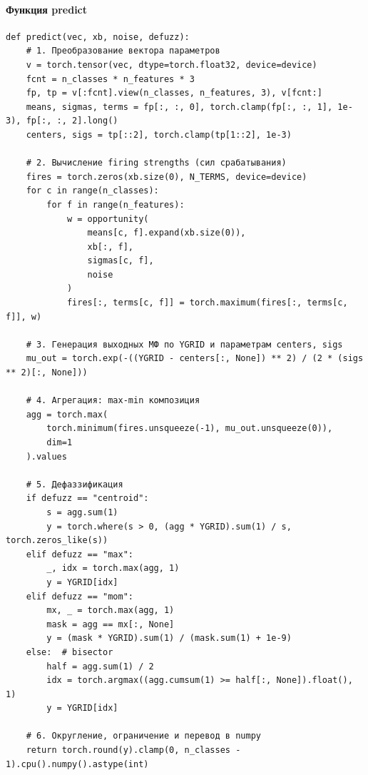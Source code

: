 \paragraph{Функция predict}
\begin{center}
\begin{verbatim}
def predict(vec, xb, noise, defuzz):
    # 1. Преобразование вектора параметров
    v = torch.tensor(vec, dtype=torch.float32, device=device)
    fcnt = n_classes * n_features * 3
    fp, tp = v[:fcnt].view(n_classes, n_features, 3), v[fcnt:]
    means, sigmas, terms = fp[:, :, 0], torch.clamp(fp[:, :, 1], 1e-3), fp[:, :, 2].long()
    centers, sigs = tp[::2], torch.clamp(tp[1::2], 1e-3)

    # 2. Вычисление firing strengths (сил срабатывания)
    fires = torch.zeros(xb.size(0), N_TERMS, device=device)
    for c in range(n_classes):
        for f in range(n_features):
            w = opportunity(
                means[c, f].expand(xb.size(0)),
                xb[:, f],
                sigmas[c, f],
                noise
            )
            fires[:, terms[c, f]] = torch.maximum(fires[:, terms[c, f]], w)

    # 3. Генерация выходных МФ по YGRID и параметрам centers, sigs
    mu_out = torch.exp(-((YGRID - centers[:, None]) ** 2) / (2 * (sigs ** 2)[:, None]))

    # 4. Агрегация: max-min композиция
    agg = torch.max(
        torch.minimum(fires.unsqueeze(-1), mu_out.unsqueeze(0)),
        dim=1
    ).values

    # 5. Дефаззификация
    if defuzz == "centroid":
        s = agg.sum(1)
        y = torch.where(s > 0, (agg * YGRID).sum(1) / s, torch.zeros_like(s))
    elif defuzz == "max":
        _, idx = torch.max(agg, 1)
        y = YGRID[idx]
    elif defuzz == "mom":
        mx, _ = torch.max(agg, 1)
        mask = agg == mx[:, None]
        y = (mask * YGRID).sum(1) / (mask.sum(1) + 1e-9)
    else:  # bisector
        half = agg.sum(1) / 2
        idx = torch.argmax((agg.cumsum(1) >= half[:, None]).float(), 1)
        y = YGRID[idx]

    # 6. Округление, ограничение и перевод в numpy
    return torch.round(y).clamp(0, n_classes - 1).cpu().numpy().astype(int)
\end{verbatim}
\end{center}

